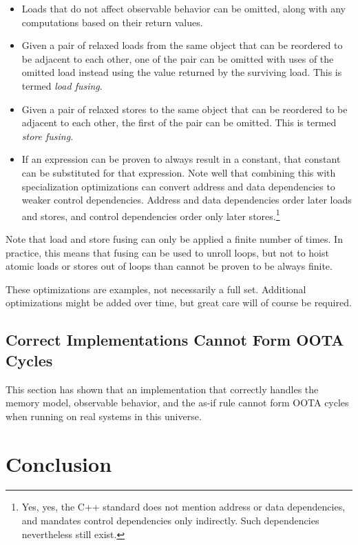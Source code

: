 \documentclass[10]{article}
\begin{document}
\begin{itemize}
\item	Loads that do not affect observable behavior can be omitted,
	along with any computations based on their return values.
\item	Given a pair of relaxed loads from the same object that can
	be reordered to be adjacent to each other, one of the pair can
	be omitted with uses of the omitted load instead using the value
	returned by the surviving load.
	This is termed \emph{load fusing}.
\item	Given a pair of relaxed stores to the same object that can
	be reordered to be adjacent to each other, the first of the pair
	can be omitted.
	This is termed \emph{store fusing}.
\item	If an expression can be proven to always result in a constant,
	that constant can be substituted for that expression.
	Note well that combining this with specialization optimizations
	can convert address and data dependencies to weaker control
	dependencies.
	Address and data dependencies order later loads and stores,
	and control dependencies order only later stores.\footnote{
		Yes, yes, the C++ standard does not mention address or
		data dependencies, and mandates control dependencies
		only indirectly.
		Such dependencies nevertheless still exist.}
\end{itemize}

Note that load and store fusing can only be applied a finite number of
times.
In practice, this means that fusing can be used to unroll loops, but
not to hoist atomic loads or stores out of loops than cannot be proven
to be always finite.

These optimizations are examples, not necessarily a full set.
Additional optimizations might be added over time, but great care will
of course be required.

\subsection{Correct Implementations Cannot Form OOTA Cycles}
\label{sec:Correct Implementations Cannot Form OOTA Cycles}

This section has shown that an implementation that correctly
handles the memory model, observable behavior, and the as-if rule
cannot form OOTA cycles when running on real systems in this
universe.

\section{Conclusion}
\label{sec:Conclusion}
\end{document}
